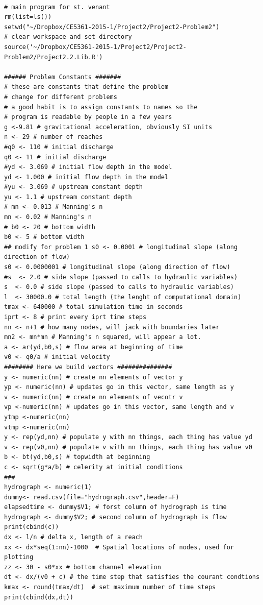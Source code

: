 \begin{lstlisting}[caption=R code for Lax Scheme, label=lst:Lax Scheme Implementation]

# main program for st. venant
rm(list=ls())
setwd("~/Dropbox/CE5361-2015-1/Project2/Project2-Problem2")
# clear workspace and set directory
source('~/Dropbox/CE5361-2015-1/Project2/Project2-Problem2/Project2.2.Lib.R')

###### Problem Constants #######
# these are constants that define the problem
# change for different problems
# a good habit is to assign constants to names so the
# program is readable by people in a few years
g <-9.81 # gravitational acceleration, obviously SI units
n <- 29 # number of reaches
#q0 <- 110 # initial discharge
q0 <- 11 # initial discharge
#yd <- 3.069 # initial flow depth in the model
yd <- 1.000 # initial flow depth in the model
#yu <- 3.069 # upstream constant depth
yu <- 1.1 # upstream constant depth
# mn <- 0.013 # Manning's n
mn <- 0.02 # Manning's n
# b0 <- 20 # bottom width
b0 <- 5 # bottom width
## modify for problem 1 s0 <- 0.0001 # longitudinal slope (along direction of flow)
s0 <- 0.0000001 # longitudinal slope (along direction of flow)
#s  <- 2.0 # side slope (passed to calls to hydraulic variables)
s  <- 0.0 # side slope (passed to calls to hydraulic variables)
l  <- 30000.0 # total length (the lenght of computational domain)
tmax <- 640000 # total simulation time in seconds
iprt <- 8 # print every iprt time steps
nn <- n+1 # how many nodes, will jack with boundaries later
mn2 <- mn*mn # Manning's n squared, will appear a lot.
a <- ar(yd,b0,s) # flow area at beginning of time
v0 <- q0/a # initial velocity
######## Here we build vectors ###############
y <- numeric(nn) # create nn elements of vector y
yp <- numeric(nn) # updates go in this vector, same length as y
v <- numeric(nn) # create nn elements of vecotr v
vp <-numeric(nn) # updates go in this vector, same length and v
ytmp <-numeric(nn)
vtmp <-numeric(nn)
y <- rep(yd,nn) # populate y with nn things, each thing has value yd
v <- rep(v0,nn) # populate v with nn things, each thing has value v0
b <- bt(yd,b0,s) # topwidth at beginning
c <- sqrt(g*a/b) # celerity at initial conditions
###
hydrograph <- numeric(1)
dummy<- read.csv(file="hydrograph.csv",header=F)
elapsedtime <- dummy$V1; # forst column of hydrograph is time
hydrograph <- dummy$V2; # second column of hydrograph is flow
print(cbind(c))
dx <- l/n # delta x, length of a reach
xx <- dx*seq(1:nn)-1000  # Spatial locations of nodes, used for plotting
zz <- 30 - s0*xx # bottom channel elevation
dt <- dx/(v0 + c) # the time step that satisfies the courant condtions
kmax <- round(tmax/dt)  # set maximum number of time steps
print(cbind(dx,dt))




\end{lstlisting}
